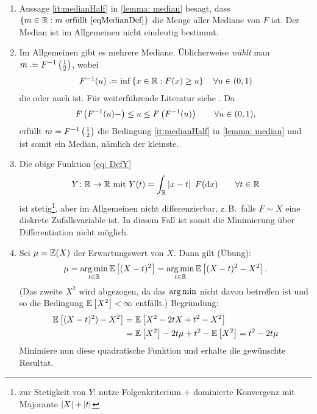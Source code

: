 \begin{bemerkung}~
	\begin{enumerate}[label=(\arabic*), leftmargin=*]
		\item Aussage \cref{it:medianHalf} in \cref{lemma: median} besagt, dass $\left\{  m \in \mathbb{R} : m \text{ erfüllt } \eqref{eqMedianDef} \right\}$ die Menge aller Mediane von $F$ ist. Der Median ist im Allgemeinen nicht eindeutig bestimmt.
		\item Im Allgemeinen gibt es mehrere Mediane. Üblicherweise \textit{wählt} man $m \defeq F^{-1} \brackets{\frac{1}{2}}$, wobei
			\begin{align*}
				F^{-1}(u) \defeq \inf\menge{ x \in \R: F(x) \ge u} \quad \forall u \in (0,1)
			\end{align*}
			die  oder auch  ist. Für weiterführende Literatur siehe \cite[Seite 20]{witting1985mathStat}. Da
			\begin{align*}
				F\left( F^{-1}(u)- \right) \le u \le F\left( F^{-1}(u) \right) \qquad \forall u \in (0,1),
			\end{align*}
			erfüllt $m = F^{-1}\left( \frac{1}{2} \right)$ die Bedingung \ref{it:medianHalf} in \cref{lemma: median} und ist somit ein Median, nämlich der kleinste.
		\item Die obige Funktion \eqref{eq: DefY}
			\begin{align*}
				Y \colon \mathbb{R} \to \mathbb{R} \text{ mit } Y(t) = \int_{\mathbb{R}} \left| x-t \right|~F(\mathrm{d}x) \qquad \forall t\in\mathbb{R}
			\end{align*}
			ist stetig\footnote{zur Stetigkeit von $Y$: nutze Folgenkriterium + dominierte Konvergenz mit Majorante $\left| X \right| + \left| t \right|$}, aber im Allgemeinen nicht differenzierbar, z.\,B.\ falls $F \sim X$ eine diskrete Zufallsvariable ist. In diesem Fall ist somit die Minimierung über Differentiation nicht möglich.
		\item Sei $\mu = \mathbb{E}(X)$ der Erwartungswert von $X$. Dann gilt (Übung):
			\begin{equation*}
				\mu = \operatorname*{arg\,min}_{t \in \mathbb{R}} \mathbb{E}\left[ (X-t)^2 \right] = \operatorname*{arg\,min}_{t \in \mathbb{R}} \mathbb{E}\left[ (X-t)^2 - X^2 \right].
			\end{equation*}
			(Das zweite $X^2$ wird abgezogen, da das $\operatorname*{arg\,min}$ nicht davon betroffen ist und so die Bedingung $\mathbb{E}\left[ X^2 \right]<\infty$ entfällt.)
			Begründung:
			\begin{align*}
				\mathbb{E}\left[ (X-t)^2) - X^2 \right]
				&= \mathbb{E}\left[ X^2 - 2tX + t^2 - X^2 \right] \\
				&= \mathbb{E}\left[ X^2 \right] - 2t\mu + t^2 - \mathbb{E}\left[ X^2 \right]
				= t^2 - 2t\mu
			\end{align*}
			Minimiere nun diese quadratische Funktion und erhalte die gewünschte Resultat.
	\end{enumerate}
\end{bemerkung}

